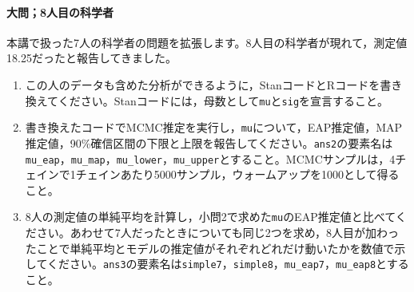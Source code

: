 \documentclass{ltjsbook}
\begin{document}
\paragraph{大問；8人目の科学者}
本講で扱った7人の科学者の問題を拡張します。8人目の科学者が現れて，測定値18.25だったと報告してきました。
\begin{enumerate}
	\item この人のデータも含めた分析ができるように，StanコードとRコードを書き換えてください。Stanコードには，母数として\verb|mu|と\verb|sig|を宣言すること。
	\item 書き換えたコードでMCMC推定を実行し，\verb|mu|について，EAP推定値，MAP推定値，90\%確信区間の下限と上限を報告してください。\verb|ans2|の要素名は\verb|mu_eap|，\verb|mu_map|，\verb|mu_lower|，\verb|mu_upper|とすること。MCMCサンプルは，4チェインで1チェインあたり5000サンプル，ウォームアップを1000として得ること。
	\item 8人の測定値の単純平均を計算し，小問2で求めた\verb|mu|のEAP推定値と比べてください。あわせて7人だったときについても同じ2つを求め，8人目が加わったことで単純平均とモデルの推定値がそれぞれどれだけ動いたかを数値で示してください。\verb|ans3|の要素名は\verb|simple7|，\verb|simple8|，\verb|mu_eap7|，\verb|mu_eap8|とすること。
\end{enumerate}
\end{document}
